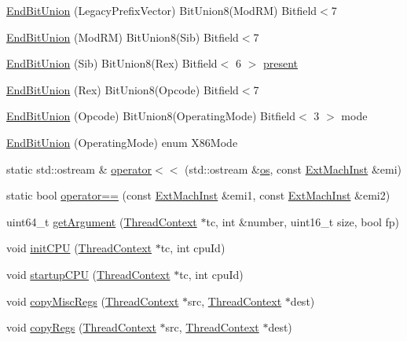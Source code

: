 \begin{DoxyCompactItemize}
\item 
\hyperlink{namespaceX86ISA_a8868c98c46358c493fc04e89771d8c73}{EndBitUnion} (LegacyPrefixVector) BitUnion8(ModRM) Bitfield$<$7
\item 
\hyperlink{namespaceX86ISA_a142b63108443fe0184a873a564a9762e}{EndBitUnion} (ModRM) BitUnion8(Sib) Bitfield$<$7
\item 
\hyperlink{namespaceX86ISA_a8cf6dc92323e70f74dd36007b5511023}{EndBitUnion} (Sib) BitUnion8(Rex) Bitfield$<$ 6 $>$ \hyperlink{namespaceX86ISA_a2c4bc7438a48bd4bbdd7ed9b629a6ec6}{present}
\item 
\hyperlink{namespaceX86ISA_a55b670a53f749beaf53363e80f49bdaa}{EndBitUnion} (Rex) BitUnion8(Opcode) Bitfield$<$7
\item 
\hyperlink{namespaceX86ISA_a7a403bd01ec592764b6f32eb899ddb93}{EndBitUnion} (Opcode) BitUnion8(OperatingMode) Bitfield$<$ 3 $>$ mode
\item 
\hyperlink{namespaceX86ISA_adc02755269202e7fd36d177fb540c2d2}{EndBitUnion} (OperatingMode) enum X86Mode
\item 
static std::ostream \& \hyperlink{namespaceX86ISA_a1c0edac96eed6e133103cbbc46effa5a}{operator$<$$<$} (std::ostream \&\hyperlink{namespaceX86ISA_a6b6e6ba763e7eaf46ac5b6372ca98d30}{os}, const \hyperlink{structX86ISA_1_1ExtMachInst}{ExtMachInst} \&emi)
\item 
static bool \hyperlink{namespaceX86ISA_abe769e58d28aff27ee71564bb6f6b0c0}{operator==} (const \hyperlink{structX86ISA_1_1ExtMachInst}{ExtMachInst} \&emi1, const \hyperlink{structX86ISA_1_1ExtMachInst}{ExtMachInst} \&emi2)
\item 
uint64\_\-t \hyperlink{namespaceX86ISA_a3f9560369e934be05b1dd8f23fbd6104}{getArgument} (\hyperlink{classThreadContext}{ThreadContext} $\ast$tc, int \&number, uint16\_\-t size, bool fp)
\item 
void \hyperlink{namespaceX86ISA_aded557a1e716c6f849b0e0b05fc77676}{initCPU} (\hyperlink{classThreadContext}{ThreadContext} $\ast$tc, int cpuId)
\item 
void \hyperlink{namespaceX86ISA_a343e9193078845bb700799b0c7f24d2a}{startupCPU} (\hyperlink{classThreadContext}{ThreadContext} $\ast$tc, int cpuId)
\item 
void \hyperlink{namespaceX86ISA_a42833096094e5ff0f2de948bf8e5965c}{copyMiscRegs} (\hyperlink{classThreadContext}{ThreadContext} $\ast$src, \hyperlink{classThreadContext}{ThreadContext} $\ast$dest)
\item 
void \hyperlink{namespaceX86ISA_aaeffcccf262b0dbd3cbcc8b4cef41168}{copyRegs} (\hyperlink{classThreadContext}{ThreadContext} $\ast$src, \hyperlink{classThreadContext}{ThreadContext} $\ast$dest)

\end{DoxyCompactItemize}

